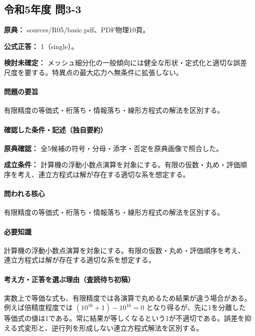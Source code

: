 \subsection{令和5年度 問3-3}
\label{q:r05-reg-basic-3-3}

\noindent\textbf{原典：} sources/R05/basic.pdf、PDF物理10頁。

\textbf{公式正答：} 1（single）。

\par\textbf{検討未確定：} メッシュ細分化の一般傾向には健全な形状・定式化と適切な誤差尺度を要する。特異点の最大応力へ無条件に拡張しない。

\paragraph{問題の要旨} 有限精度の等価式・桁落ち・情報落ち・線形方程式の解法を区別する。

\paragraph{確認した条件・記述（独自要約）}\mbox{}\par

\noindent\textbf{原典確認：} 全5候補の符号・分母・添字・否定を原典画像で照合した。\par

\noindent\textbf{成立条件：} 計算機の浮動小数点演算を対象にする。有限の仮数・丸め・評価順序を考え、連立方程式は解が存在する適切な系を想定する。\par

\paragraph{問われる核心} 有限精度の等価式・桁落ち・情報落ち・線形方程式の解法を区別する。

\paragraph{必要知識} 計算機の浮動小数点演算を対象にする。有限の仮数・丸め・評価順序を考え、連立方程式は解が存在する適切な系を想定する。

\paragraph{考え方・正答を選ぶ理由（査読待ち初稿）} 実数上で等価な式も、有限精度では各演算で丸めるため結果が違う場合がある。例えば倍精度程度では \((10^{16}+1)-10^{16}=0\) となり得るが、先に1を分離した等価式の値は1である。常に結果が等しくなるという1が不適切である。誤差を抑える式変形と、逆行列を形成しない連立方程式解法を区別する。

